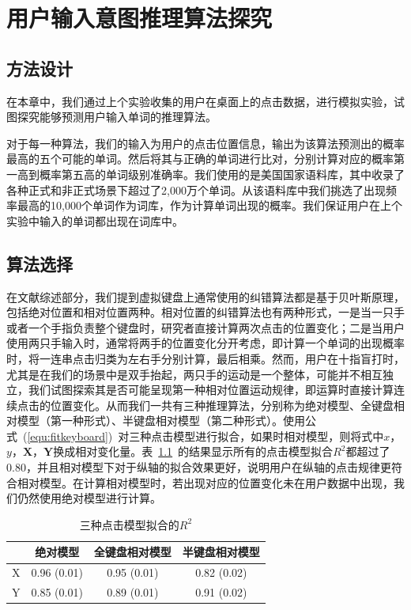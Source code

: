 \chapter{用户输入意图推理算法探究}
\label{cha:algorithm}
\section{方法设计}
在本章中，我们通过上个实验收集的用户在桌面上的点击数据，进行模拟实验，试图探究能够预测用户输入单词的推理算法。

对于每一种算法，我们的输入为用户的点击位置信息，输出为该算法预测出的概率最高的五个可能的单词。然后将其与正确的单词进行比对，分别计算对应的概率第一高到概率第五高的单词级别准确率。我们使用的是美国国家语料库，其中收录了各种正式和非正式场景下超过了2,000万个单词。从该语料库中我们挑选了出现频率最高的10,000个单词作为词库，作为计算单词出现的概率。我们保证用户在上个实验中输入的单词都出现在词库中。

\section{算法选择}
在文献综述部分，我们提到虚拟键盘上通常使用的纠错算法都是基于贝叶斯原理，包括绝对位置和相对位置两种。相对位置的纠错算法也有两种形式，一是当一只手或者一个手指负责整个键盘时，研究者直接计算两次点击的位置变化；二是当用户使用两只手输入时，通常将两手的位置变化分开考虑，即计算一个单词的出现概率时，将一连串点击归类为左右手分别计算，最后相乘。然而，用户在十指盲打时，尤其是在我们的场景中是双手抬起，两只手的运动是一个整体，可能并不相互独立，我们试图探索其是否可能呈现第一种相对位置运动规律，即运算时直接计算连续点击的位置变化。从而我们一共有三种推理算法，分别称为绝对模型、全键盘相对模型（第一种形式）、半键盘相对模型（第二种形式）。使用公式~(\ref{equ:fitkeyboard})~对三种点击模型进行拟合，如果时相对模型，则将式中$x$，$y$，$\textbf{X}$，$\textbf{Y}$换成相对变化量。表~\ref{tab:modelr2}~的结果显示所有的点击模型拟合$R^2$都超过了0.80，并且相对模型下对于纵轴的拟合效果更好，说明用户在纵轴的点击规律更符合相对模型。在计算相对模型时，若出现对应的位置变化未在用户数据中出现，我们仍然使用绝对模型进行计算。

\begin{table}[htb]
  \centering
  \begin{minipage}[t]{0.6\linewidth} %
  \caption[三种点击模型拟合的$R^{2}$]{三种点击模型拟合的$R^{2}$}
  \label{tab:modelr2}
    \centering
    \begin{tabularx}{\linewidth}{cccc}
      \toprule[1.5pt]
      & 绝对模型 & 全键盘相对模型 & 半键盘相对模型 \\\midrule[1pt]
      X & 0.96 (0.01) & 0.95 (0.01) & 0.82 (0.02) \\
      Y & 0.85 (0.01) & 0.89 (0.01) & 0.91 (0.02) \\
      \bottomrule[1.5pt]
    \end{tabularx}
  \end{minipage}
\end{table}

